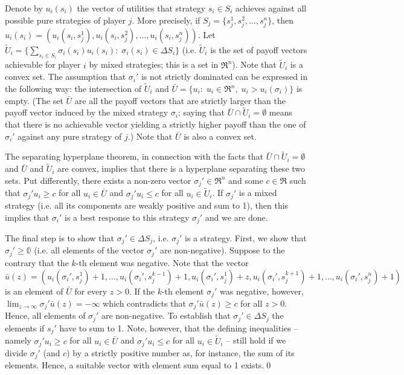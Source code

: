 \documentclass[a4paper,11pt]{article}
\begin{document}
Denote by $u_i(s_i)$ the vector of utilities that strategy $s_i\in S_i$ achieves against all possible pure strategies of player $j$. More precisely, if $S_j=\{s_j^1,s_j^2,\dots,s_j^n\}$, then $u_i(s_i)=(u_i(s_i,s_j^1),u_i(s_i,s_j^2),\dots,u_i(s_i,s_j^n))$. Let $\tilde{U}_i=\{\sum_{s_i\in S_i}\sigma_i(s_i) u_i(s_i):\;\sigma_i(s_i)\in\Delta S_i\}$ (i.e. $\tilde{U}_i$ is the set of payoff vectors achievable for player $i$ by mixed strategies; this is a set in $\Re^n$). Note that $\tilde{U}_i$ is a convex set. The assumption that $\sigma_i'$ is not strictly dominated can be expressed in the following way: the intersection of $\tilde{U}_i$ and $\bar{U}=\{ u_i:\;u_i\in\Re^n,\;u_i>u_i(\sigma_i)\}$ is empty. (The set $\bar{{U}}$ are all the payoff vectors that are strictly larger than the payoff vector induced by the mixed strategy $\sigma_i$; saying that $\bar{U}\cap\tilde{U}_i=\emptyset$ means that there is no achievable vector yielding a strictly higher payoff than the one of $\sigma_i'$  against any pure strategy of $j$.) Note that $\bar{U}$ is also a convex set.

The separating hyperplane theorem, in connection with the facts that $\bar{U}\cap\tilde{U}_i=\emptyset$ and $\bar{U}$ and $\tilde{U}_i$ are convex, implies that there is a hyperplane separating these two sets. Put differently, there exists a non-zero vector $\sigma_j'\in \Re^n$ and some $c\in \Re$ such that $\sigma_j' u_i\geq c$ for all $u_i\in \bar{U}$ and $\sigma_j'u_i\leq c$ for all $u_i\in\tilde{U}_i$. If $\sigma_j'$ is a mixed strategy (i.e. all its components are weakly positive and sum to 1), then this implies that $\sigma_i'$ is a best response to this strategy $\sigma_j'$ and we are done.

The final step is to show that $\sigma_j'\in\Delta S_j$, i.e. $\sigma_j'$ is a strategy. First, we show that $\sigma_j'\geq \mathbb{0}$ (i.e. all elements of the vector $\sigma_j'$ are non-negative). Suppose to the contrary that the $k$-th element was negative. Note that the vector $\bar u(z)=(u_i(\sigma_i',s_j^1)+1,\dots,u_i(\sigma_i',s_j^{k-1})+1,u_i(\sigma_i',s_j^1)+z,u_i(\sigma_i',s_j^{k+1})+1,\dots,u_i(\sigma_i',s_j^n)+1)$ is an element of $\bar{U}$ for every $z>0$. If the $k$-th element $\sigma_j'$ was negative, however, $\lim_{z\rightarrow\infty}\sigma_j' \bar u(z)=-\infty$ which contradicts that $\sigma_j'\bar u(z)\geq c$ for all $z>0$. Hence, all elements of $\sigma_j'$ are non-negative. To establish that $\sigma_j'\in \Delta S_j$ the elements if $s_j'$ have to sum to 1. Note, however, that the defining inequalities -- namely $\sigma_j' u_i\geq c$ for all $u_i\in \bar{U}$ and $\sigma_j'u_i\leq c$ for all $u_i\in\tilde{U}_i$ -- still hold if we divide $\sigma_j'$ (and $c$) by a strictly positive number as, for instance, the sum of its elements. Hence, a suitable vector with element sum equal to 1 exists.\qed
\end{document}
